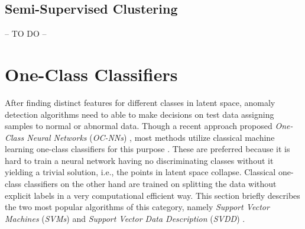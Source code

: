\subsection{Semi-Supervised Clustering}
\label{subsec:Semi-SupervisedClustering}
-- TO DO --
\section{One-Class Classifiers}
\label{sec:One-ClassClassifiers}
After finding distinct features for different classes in latent space, anomaly detection algorithms need to able to make decisions on test data assigning samples to normal or abnormal data. Though a recent approach proposed \textit{One-Class Neural Networks} (\textit{OC-NNs}) \cite{OCNN}, most methods utilize classical machine learning one-class classifiers for this purpose \cite{DOC} \cite{DeepSVDD} \cite{IntraClass}. These are preferred because it is hard to train a neural network having no discriminating classes   without it yielding a trivial solution, i.e., the points in latent space collapse. Classical one-class classifiers on the other hand are trained on splitting the data without explicit labels in a very computational efficient way. This section briefly describes the two most popular algorithms of this category, namely \textit{Support Vector Machines} (\textit{SVMs}) \cite{SVM} and \textit{Support Vector Data Description} (\textit{SVDD}) \cite{SVDD}. 

